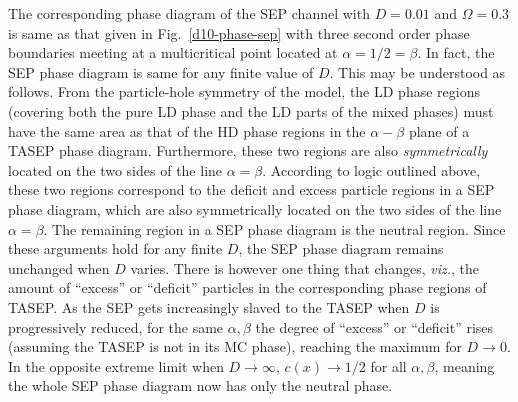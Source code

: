 \documentclass[aps,pre,twocolumn,superscriptaddress,amsmath,amssymb,longbibliography,floatfix,nofootinbib]{revtex4}
\begin{document}
{The corresponding phase diagram of the SEP channel with $D=0.01$ and $\Omega=0.3$ is same as that given in Fig.~\ref{d10-phase-sep} with three second order phase boundaries meeting at a multicritical point located at $\alpha=1/2=\beta$. In fact, the SEP phase diagram is same for any finite value of $D$. This may be understood as follows. From the particle-hole symmetry of the model, the LD phase regions (covering both the pure LD phase and the LD parts of the mixed phases) must have the same area as that of the HD phase regions in the $\alpha-\beta$ plane of a TASEP phase diagram. Furthermore, these two regions are also {\em symmetrically} located on the two sides of the line $\alpha=\beta$. According to logic outlined above, these two regions correspond to the deficit and excess particle regions in a SEP phase diagram, which are also symmetrically located on the two sides of the line $\alpha=\beta$. The remaining region in a SEP phase diagram is the neutral region. Since these arguments hold for any finite $D$, the SEP phase diagram remains unchanged when $D$ varies. There is however one thing that changes, {\em viz.}, the amount of ``excess'' or ``deficit'' particles in the corresponding phase regions of TASEP. As the SEP gets increasingly slaved to the TASEP when $D$ is progressively reduced, for the same $\alpha,\beta$ the degree of ``excess'' or ``deficit'' rises   (assuming the TASEP is not in its MC phase), reaching the maximum for $D\rightarrow 0$. In the opposite extreme limit when $D\rightarrow \infty$, $c(x)\rightarrow 1/2$ for all $\alpha,\beta$, meaning the whole SEP phase diagram now has only the neutral phase. 

}
\end{document}
